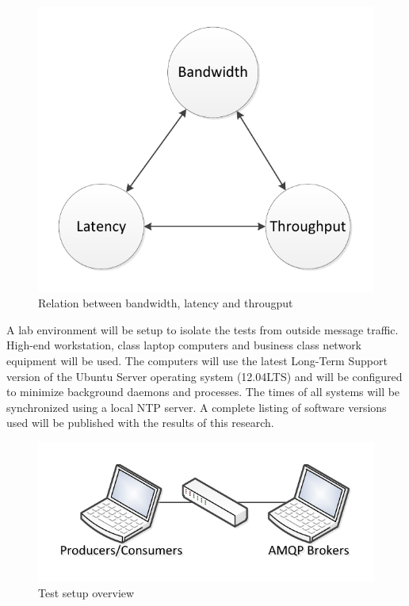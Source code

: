 \documentclass{thesis}
\begin{document}
\begin{figure}
\centering
\vspace{2.0in} 
\includegraphics{bandwidth_latency_throughput}  
\caption{Relation between bandwidth, latency and througput}
\label{Figure 1}  
\end{figure}

A lab environment will be setup to isolate the tests from outside message traffic.  High-end workstation, class laptop computers and business class network equipment will be used.  The computers will use the latest Long-Term Support version of the Ubuntu Server operating system (12.04LTS) and will be configured to minimize background daemons and processes.  The times of all systems will be synchronized using a local NTP server. A complete listing of software versions used will be published with the results of this research.


\begin{figure}
\centering
\vspace{2.0in} 
\includegraphics{test_setup}  
\caption{Test setup overview}
\label{Figure 1}  
\end{figure}
\end{document}
